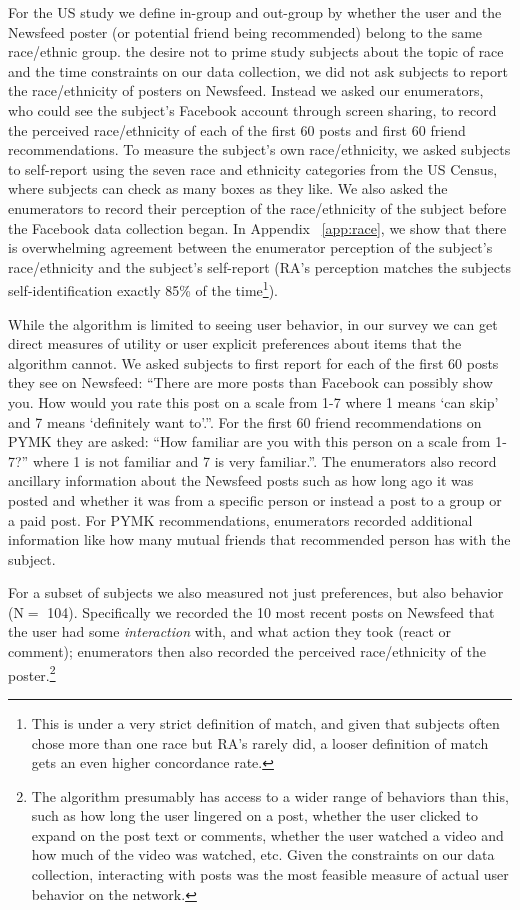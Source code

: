 \documentclass[12pt,letterpaper]{article}
\newcommand{\RecentInteractionsSampleSize}{104}
\begin{document}
For the US study we define in-group and out-group by whether the user and the Newsfeed poster (or potential friend being recommended) belong to the same race/ethnic group. the desire not to prime study subjects about the topic of race and the time constraints on our data collection, we did not ask subjects to report the race/ethnicity of posters on Newsfeed. Instead we asked our enumerators, who could see the subject's Facebook account through screen sharing, to record the perceived race/ethnicity of each of the first 60 posts and first 60 friend recommendations. To measure the subject's own race/ethnicity, we asked subjects to self-report using the seven race and ethnicity categories from the US Census, where subjects can check as many boxes as they like. We also asked the enumerators to record their perception of the race/ethnicity of the subject before the Facebook data collection began. In Appendix ~\ref{app:race}, we show that there is overwhelming agreement between the enumerator perception of the subject's race/ethnicity and the subject's self-report (RA's perception matches the subjects self-identification exactly 85\% of the time\footnote{This is under a very strict definition of match, and given that subjects often chose more than one race but RA's rarely did, a looser definition of match gets an even higher concordance rate.}).

While the algorithm is limited to seeing user behavior, in our survey we can get direct measures of utility or user explicit preferences about items that the algorithm cannot. We asked subjects to first report for each of the first 60 posts they see on Newsfeed: “There are more posts than Facebook can possibly show you. How would you rate this post on a scale from 1-7 where 1 means ‘can skip’ and 7 means ‘definitely want to'.''. For the first 60 friend recommendations on PYMK they are asked: “How familiar are you with this person on a scale from 1-7?” where 1 is not familiar and 7 is very familiar.''. The enumerators also record ancillary information about the Newsfeed posts such as how long ago it was posted and whether it was from a specific person or instead a post to a group or a paid post. For PYMK recommendations, enumerators recorded additional information like how many mutual friends that recommended person has with the subject.

For a subset of subjects we also measured not just preferences, but also behavior (N$=$ \RecentInteractionsSampleSize).  Specifically we recorded the 10 most recent posts on Newsfeed that the user had some \emph{interaction} with, and what action they took (react or comment); enumerators then also recorded the perceived race/ethnicity of the poster.\footnote{The algorithm presumably has access to a wider range of behaviors than this, such as how long the user lingered on a post, whether the user clicked to expand on the post text or comments, whether the user watched a video and how much of the video was watched, etc. Given the constraints on our data collection, interacting with posts was the most feasible measure of actual user behavior on the network.} 
\end{document}
